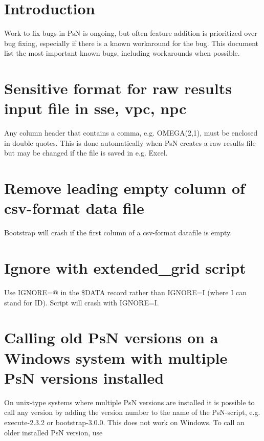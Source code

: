 



\maketitle


\section{Introduction}
Work to fix bugs in PsN is ongoing, but often feature addition is prioritized over bug fixing, especially if there is a known workaround for the bug. This document list the most important known bugs, including workarounds when possible.   

\section{Sensitive format for raw results input file in sse, vpc, npc}

Any column header that contains a comma, e.g. OMEGA(2,1), must be enclosed in double quotes. This is done automatically when PsN creates a raw results file but may be changed if the file is saved in e.g. Excel.

\section{Remove leading empty column of csv-format data file}

Bootstrap will crash if the first column of a csv-format datafile is empty.

\section{Ignore with extended\_grid script}
Use IGNORE=@ in the \$DATA record rather than IGNORE=I (where I can stand for ID). Script will crash with IGNORE=I.

\section{Calling old PsN versions on a Windows system with multiple PsN versions installed}
On unix-type systems where multiple PsN versions are installed it is possible to call any version by adding the version number to the name of the PsN-script, e.g. execute-2.3.2 or bootstrap-3.0.0. This does not work on Windows. To call an older installed PsN version, use 

